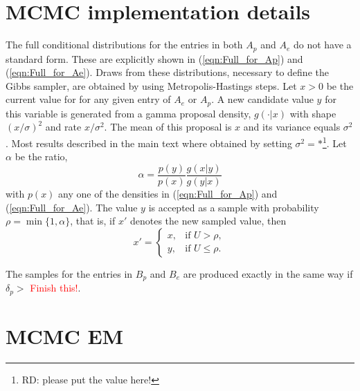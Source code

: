 \documentclass[11pt]{amsart}
\theoremstyle{definition}
\theoremstyle{remark}
\begin{document}
\section{MCMC implementation details}\label{sec:MHsteps}
The full conditional distributions for the entries in both $A_p$ and
$A_e$ do not have a standard form. These are explicitly shown in
(\ref{eqn:Full_for_Ap}) and (\ref{eqn:Full_for_Ae}). Draws from these
distributions, necessary to define the Gibbs sampler,  are obtained by
using Metropolis-Hastings steps.  Let $x > 0$ be the current value for
for any given entry of $A_e$ or $A_p$. A new candidate value $y$ for
this variable is generated from a gamma proposal density, $g(\cdot|
x)$ with shape $(x/\sigma)^2$ and rate $x/\sigma^2$. The mean of this
proposal is $x$ and its variance equals $\sigma^2$. Most results
described in the main text where obtained by setting $\sigma^2 =
*$\footnote{RD: please put the value here!}. Let $\alpha$ be
the ratio,
\[
  \alpha 
 =
  \frac{p(y)}{p(x)} \frac{g(x|y)}{g(y|x)}
\]
with $p(x)$ any one of the densities in (\ref{eqn:Full_for_Ap}) and
(\ref{eqn:Full_for_Ae}). The value $y$ is accepted as a sample
with probability $\rho = \min\{1, \alpha\}$, that is, if $x'$ denotes
the new sampled value, then
\[
   x'
    =
  \begin{cases}
    x, & \text{if } U > \rho,\\
    y, & \text{if } U \leq \rho.
  \end{cases}
\]

The samples for the entries in $B_p$ and $B_e$ are produced exactly in
the same way if $\delta_p > $ \textcolor{red}{Finish this!}.

\section{MCMC EM}
\end{document}
